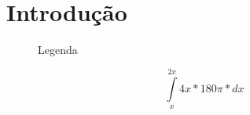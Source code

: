 \section{Introdução}
\lipsum[1]
\begin{figure}[h]
	\caption{Legenda}
	\label{fig:placeholder.jpg}
\end{figure}
\begin{center}
	\begin{equation}
		\int\limits_{x}^{2x} 4x*180\pi*dx
	\end{equation}
\end{center}